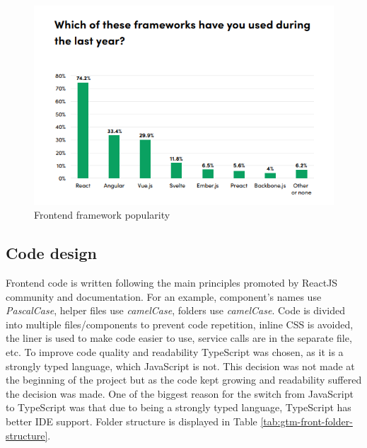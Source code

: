 \begin{figure}[h]
    \includegraphics[width=\textwidth]{figures/frontend_framework_popularity}
    \caption{Frontend framework popularity~\cite{state-of-frontend-report}}
    \label{fig:frontend-framework-popularity}
\end{figure}

\subsection{Code design}\label{subsec:code-design}
Frontend code is written following the main principles promoted by ReactJS community and documentation.
For an example, component's names use \textit{PascalCase}, helper files use \textit{camelCase}, folders use \textit{camelCase}.
Code is divided into multiple files/components to prevent code repetition, inline CSS is avoided, the liner is used to make code easier to use, service calls are in the separate file, etc.
To improve code quality and readability TypeScript was chosen, as it is a strongly typed language, which JavaScript is not.
This decision was not made at the beginning of the project but as the code kept growing and readability suffered the decision was made.
One of the biggest reason for the switch from JavaScript to TypeScript was that due to being a strongly typed language,
TypeScript has better IDE support.
Folder structure is displayed in Table
\ref{tab:gtm-front-folder-structure}.

